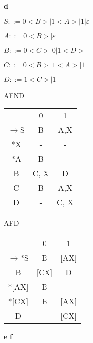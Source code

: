 \documentclass[ ]{article}
\begin{document}
		\newpage
		\textbf{d} %
		
		$S::= 0<B> | 1<A> | 1 | \varepsilon$
		
		$A::= 0<B> | \varepsilon$
		
		$B::= 0<C> | 0 | 1<D>$
		
		$C::= 0<B> | 1<A> | 1$
		
		$D::= 1<C> | 1$
		
		\begin{center}
		AFND\\
		
		\begin{tabular}{ c c c }
  & 0 & 1 \\ 
 $\to$S & B & A,X \\  
 *X & - & - \\
 *A & B & - \\
 B & C, X & D\\
 C& B & A,X\\
 D & - & C, X
		\end{tabular}
		\end{center}
		
		\begin{center}
		AFD\\
		
		\begin{tabular}{ c c c }
   & 0 & 1 \\ 
 $\to$*S & B & [AX] \\  
 B & [CX] & D\\
 *[AX] & B & - \\
 *[CX] & B & [AX]\\
 D & - & [CX]
 		\end{tabular}
		\end{center}
		\textbf{e}
		\textbf{f}
\end{document}
